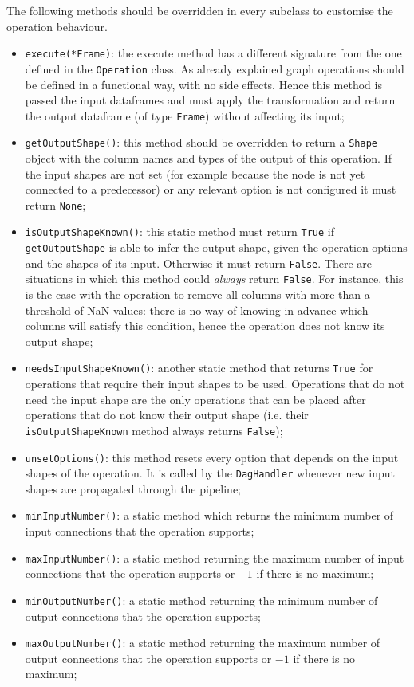 \clearpage
{}
The following methods should be overridden in every subclass to customise the operation behaviour.
\begin{itemize}
	\item \texttt{execute(*Frame)}: the execute method has a different signature from the one defined in the \texttt{Operation} class. As already explained graph operations should be defined in a functional way, with no side effects. Hence this method is passed the input dataframes and must apply the transformation and return the output dataframe (of type \texttt{Frame}) without affecting its input;
	\item \texttt{getOutputShape()}: this method should be overridden to return a \texttt{Shape} object with the column names and types of the output of this operation. If the input shapes are not set (for example because the node is not yet connected to a predecessor) or any relevant option is not configured it must return \texttt{None};
	\item \texttt{isOutputShapeKnown()}: this static method must return \texttt{True} if \texttt{getOutputShape} is able to infer the output shape, given the operation options and the shapes of its input. Otherwise it must return \texttt{False}. There are situations in which this method could \textit{always} return \texttt{False}. For instance, this is the case with the operation to remove all columns with more than a threshold of NaN values: there is no way of knowing in advance which columns will satisfy this condition, hence the operation does not know its output shape;
	\item \texttt{needsInputShapeKnown()}: another static method that returns \texttt{True} for operations that require their input shapes to be used. Operations that do not need the input shape are the only operations that can be placed after operations that do not know their output shape (i.e. their \texttt{isOutputShapeKnown} method always returns \texttt{False});
	\item \texttt{unsetOptions()}: this method resets every option that depends on the input shapes of the operation. It is called by the \texttt{DagHandler} whenever new input shapes are propagated through the pipeline;
	\item \texttt{minInputNumber()}: a static method which returns the minimum number of input connections that the operation supports;
	\item \texttt{maxInputNumber()}: a static method returning the maximum number of input connections that the operation supports or $-1$ if there is no maximum;
	\item \texttt{minOutputNumber()}: a static method returning the minimum number of output connections that the operation supports;
	\item \texttt{maxOutputNumber()}: a static method returning the maximum number of output connections that the operation supports or $-1$ if there is no maximum;
\end{itemize}


